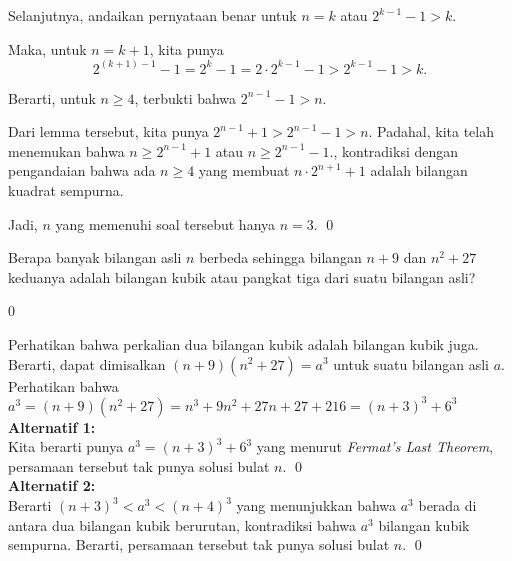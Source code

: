 \documentclass[11pt]{scrartcl}
\begin{document}
\begin{soalbaru}
\begin{solusi}
\begin{lemmarev}
\begin{buktilemma}
			Selanjutnya, andaikan pernyataan benar untuk $n=k$ atau $2^{k-1}-1 > k$.
			
			Maka, untuk $n=k+1$, kita punya 
			$$2^{(k+1)-1}-1=2^k-1=2 \cdot 2^{k-1} -1 > 2^{k-1}-1 > k.$$
			
			Berarti, untuk $n \ge 4$, terbukti bahwa $2^{n-1}-1 > n$.
			\end{buktilemma}
			\end{lemmarev}
			
			Dari lemma tersebut, kita punya $2^{n-1}+1 > 2^{n-1}-1 > n$. Padahal, kita telah menemukan bahwa $n \ge 2^{n-1}+1$ atau $n \ge 2^{n-1}-1$., kontradiksi dengan pengandaian bahwa ada $n \ge 4$ yang membuat $n \cdot 2^{n+1} +1$ adalah bilangan kuadrat sempurna.
			
			Jadi, $n$ yang memenuhi soal tersebut hanya $n=3$. \qed
		\end{solusi}
	\end{soalbaru}
\vspace{20pt}
	\begin{soalbaru}
		Berapa banyak bilangan asli $n$ berbeda sehingga bilangan $n+9$ dan $n^2+27$ keduanya adalah bilangan kubik atau pangkat tiga dari suatu bilangan asli?
		
		\begin{jawaban}
				0
				\end{jawaban}
				\begin{solusi}
				Perhatikan bahwa perkalian dua bilangan kubik adalah bilangan kubik juga. Berarti, dapat dimisalkan $(n+9)(n^2+27)=a^3$ untuk suatu bilangan asli $a$. Perhatikan bahwa $a^3=(n+9)(n^2+27)=n^3+9n^2+27n+27+216=(n+3)^3+6^3$\\
                \textbf{Alternatif 1:}\\
                Kita berarti punya $a^3=(n+3)^3+6^3$ yang menurut \textit{Fermat's Last Theorem}, persamaan tersebut tak punya solusi bulat $n$. \qed\\
                \textbf{Alternatif 2:}\\
                Berarti $(n+3)^3 < a^3 < (n+4)^3$ yang menunjukkan bahwa $a^3$ berada di antara dua bilangan kubik berurutan, kontradiksi bahwa $a^3$ bilangan kubik sempurna. Berarti, persamaan tersebut tak punya solusi bulat $n$. 
                \qed
				\end{solusi}
	\end{soalbaru}
\end{document}
